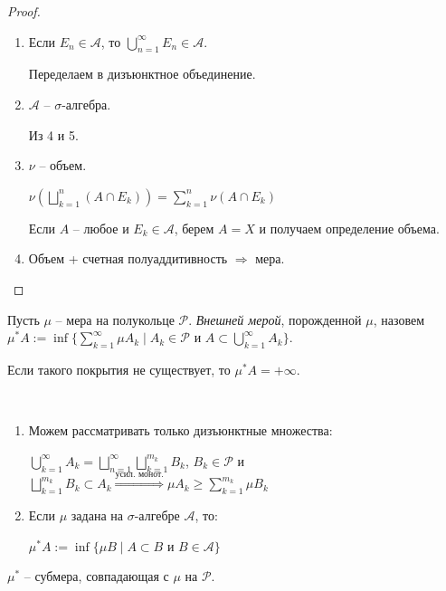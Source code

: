 \begin{proof}
\begin{enumerate}
        \item Если $E_n\in \mathcal{A}$, то $\bigcup\limits_{n=1}^\infty E_n\in \mathcal{A}$.
        
        Переделаем в дизъюнктное объединение.

        \item $\mathcal{A}$ – $\sigma$-алгебра.
        
        Из 4 и 5.
        \item $\nu$ – объем.
        
        $\nu(\bigsqcup\limits_{k=1}^n (A\cap E_k))=\sum\limits_{k=1}^n \nu(A\cap E_k)$

        Если $A$ –  любое и $E_k\in \mathcal{A}$, берем $A=X$ и получаем определение объема.

        \item Объем + счетная полуаддитивность $\Rightarrow$ мера.
    \end{enumerate}
\end{proof}

\begin{definition}
    Пусть $\mu$ – мера на полукольце $\mathcal{P}$. \textit{Внешней мерой}, порожденной $\mu$, назовем
    $\mu^* A:=\inf \{\sum\limits_{k=1}^\infty \mu A_k\mid A_k\in \mathcal{P}\text{ и } A\subset \bigcup\limits_{k=1}^\infty A_k\}$.

    Если такого покрытия не существует, то $\mu^* A = +\infty$.
\end{definition}

\begin{remark}~
    \begin{enumerate}
        \item Можем рассматривать только дизъюнктные множества:
        
        $\bigcup\limits_{k=1}^\infty A_k = \bigsqcup\limits_{n=1}^\infty\bigsqcup \limits_{k=1}^{m_k} B_k$, 
        $B_k\in \mathcal{P}$ и $\bigsqcup\limits_{k=1}^{m_k} B_k \subset A_k\overset{\text{усил. монот.}}{\Rightarrow}\mu A_k \geq \sum \limits_{k=1}^{m_k} \mu B_k$

        \item Если $\mu$ задана на $\sigma$-алгебре $\mathcal{A}$, то:
        
        $\mu^*A :=\inf \{\mu B\mid A \subset B\text{ и } B \in \mathcal{A}\}$
    \end{enumerate}
\end{remark}

\begin{theorem}
    $\mu^*$ – субмера, совпадающая с $\mu$ на $\mathcal{P}$.
\end{theorem}

